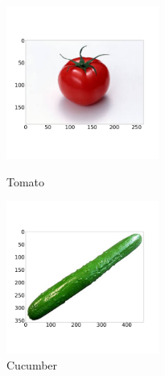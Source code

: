 \documentclass[11pt,a4j]{jarticle}
\begin{document}
\begin{figure}[ht]
	\begin{minipage}{0.5\hsize}
		\centering
		\includegraphics[width=5cm]{../1_BasicImageProcessing/output/tomato.jpg}
		\vspace{-1cm}
		\renewcommand{\figurename}{Fig}
		\caption{Tomato}
		\label{tomato}
	\end{minipage}
	\begin{minipage}{0.5\hsize}
		\centering
		\includegraphics[width=5cm]{../1_BasicImageProcessing/output/cucumber.jpg}
		\vspace{-1cm}
		\renewcommand{\figurename}{Fig}
		\caption{Cucumber}
		\label{cucumber}
	\end{minipage}
\end{figure}
\end{document}
